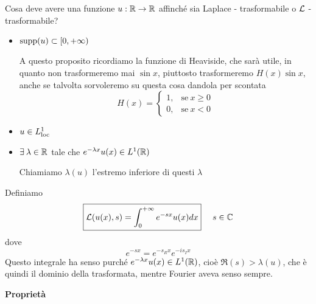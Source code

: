 Cosa deve avere una funzione $u: \mathbb{R}\rightarrow \mathbb{R}$ affinché sia Laplace - trasformabile o $\mathcal{L}$ - trasformabile?
\begin{itemize}
\item $\operatorname*{supp}(u) \subset [0, + \infty)$

A questo proposito ricordiamo la funzione di Heaviside, che sarà utile, in quanto non trasformeremo mai $\sin x$, piuttosto trasformeremo $H(x)\sin x$, anche se talvolta sorvoleremo su questa cosa dandola per scontata
\begin{equation*}
H(x) =
\begin{cases}
1, & \text{se} \ x\geq 0\\
0, & \text{se} \ x < 0
\end{cases}
\end{equation*}
\item $u\in L^{1}_{\operatorname{loc}}$
\item $\exists \lambda \in \RR$ tale che $e^{- \lambda x} u(x) \in L^{1}(\mathbb{R})$

Chiamiamo $\lambda (u)$ l'estremo inferiore di questi $\lambda $
\end{itemize}
\begin{defn}
Definiamo
\begin{equation*}
\boxed{\mathcal{L}(u(x), s) = \int^{+ \infty}_{0} e^{- sx} u(x) dx} \ \ \ \ s\in \mathbb{C}
\end{equation*}
dove
\begin{equation*}
e^{- sx} = e^{- s_{R} x} e^{- is_{I} x}
\end{equation*}
Questo integrale ha senso purché $e^{- \lambda x} u(x) \in L^{1}(\mathbb{R})$, cioè $\Re (s) > \lambda (u)$, che è quindi il dominio della trasformata, mentre Fourier aveva senso sempre.
\end{defn}
\textbf{Proprietà}
